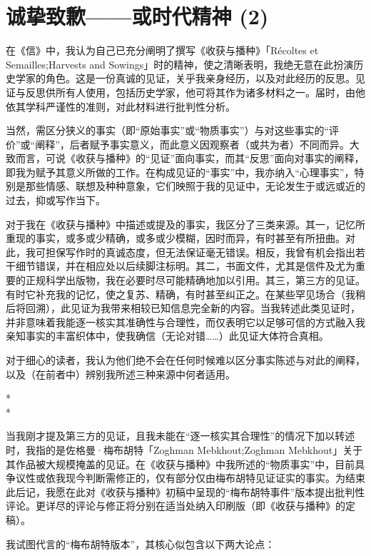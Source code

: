 \section{诚挚致歉——或时代精神 (2)}

在《信》中，我认为自己已充分阐明了撰写《收获与播种》「Récoltes et Semailles;Harvests and Sowings」时的精神，使之清晰表明，我绝无意在此扮演历史学家的角色。这是一份真诚的见证，关乎我亲身经历，以及对此经历的反思。见证与反思供所有人使用，包括历史学家，他可将其作为诸多材料之一。届时，由他依其学科严谨性的准则，对此材料进行批判性分析。

当然，需区分狭义的事实（即“原始事实”或“物质事实”）与对这些事实的“评价”或“阐释”，后者赋予事实意义，而此意义因观察者（或共为者）不同而异。大致而言，可说《收获与播种》的“见证”面向事实，而其“反思”面向对事实的阐释，即我为赋予其意义所做的工作。在构成见证的“事实”中，我亦纳入“心理事实”，特别是那些情感、联想及种种意象，它们映照于我的见证中，无论发生于或远或近的过去，抑或写作当下。

对于我在《收获与播种》中描述或提及的事实，我区分了三类来源。其一，记忆所重现的事实，或多或少精确，或多或少模糊，因时而异，有时甚至有所扭曲。对此，我可担保写作时的真诚态度，但无法保证毫无错误。相反，我曾有机会指出若干细节错误，并在相应处以后续脚注标明。其二，书面文件，尤其是信件及尤为重要的正规科学出版物，我在必要时尽可能精确地加以引用。其三，第三方的见证。有时它补充我的记忆，使之复苏、精确，有时甚至纠正之。在某些罕见场合（我稍后将回溯），此见证为我带来相较已知信息完全新的内容。当我转述此类见证时，并非意味着我能逐一核实其准确性与合理性，而仅表明它以足够可信的方式融入我亲知事实的丰富织体中，使我确信（无论对错……）此见证大体符合真相。

对于细心的读者，我认为他们绝不会在任何时候难以区分事实陈述与对此的阐释，以及（在前者中）辨别我所述三种来源中何者适用。

\begin{center}
    * \quad * \\
    *
\end{center}

当我刚才提及第三方的见证，且我未能在“逐一核实其合理性”的情况下加以转述时，我指的是佐格曼·梅布胡特「Zoghman Mebkhout;Zoghman Mebkhout」关于其作品被大规模掩盖的见证。在《收获与播种》中我所述的“物质事实”中，目前具争议性或依我现今判断需修正的，仅有部分仅由梅布胡特见证证实的事实。为结束此后记，我愿在此对《收获与播种》初稿中呈现的“梅布胡特事件”版本提出批判性评论。更详尽的评论与修正将分别在适当处纳入印刷版（即《收获与播种》的定稿）。

我试图代言的“梅布胡特版本”，其核心似包含以下两大论点：

